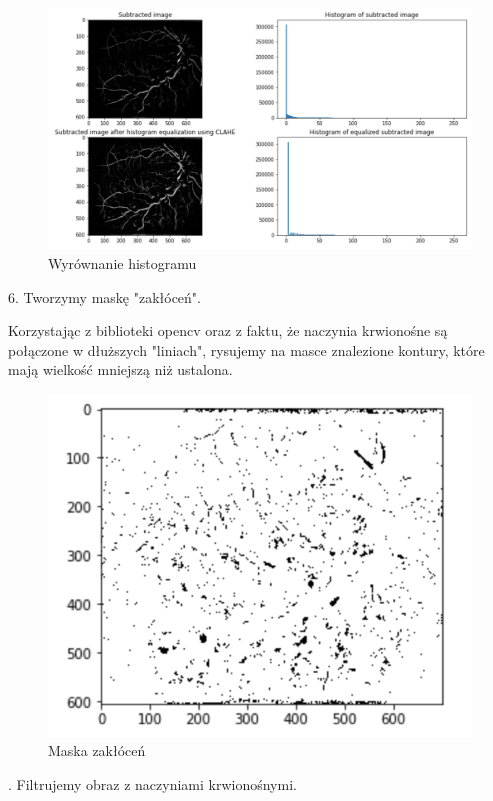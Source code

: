 \documentclass[11pt]{article}
\begin{document}
\begin{figure}[h]
    \centering
	\includegraphics[scale=0.4]{res/img_pro_5.png}
	\caption{Wyrównanie histogramu}
	\label{fig:demo}
\end{figure}

6. Tworzymy maskę "zakłóceń".

Korzystając z biblioteki opencv oraz z faktu, że naczynia krwionośne są połączone w dłuższych "liniach", rysujemy na masce znalezione kontury, które mają wielkość mniejszą niż ustalona. 

\begin{figure}[h]
    \centering
	\includegraphics[scale=0.4]{res/img_pro_6.png}
	\caption{Maska zakłóceń}
	\label{fig:demo}
\end{figure}
. Filtrujemy obraz z naczyniami krwionośnymi.
\end{document}
